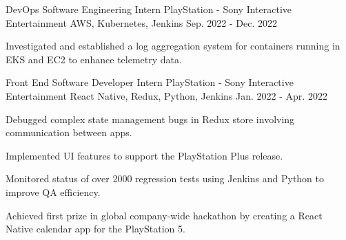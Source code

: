 

\begin{cventries}

  \cventry
    {DevOps Software Engineering Intern} %
    {PlayStation - Sony Interactive Entertainment} %
    {AWS, Kubernetes, Jenkins} %
    {Sep. 2022 - Dec. 2022} %
    {
      \begin{cvitems} %
        \item {Investigated and established a log aggregation system for containers running in EKS and EC2 to enhance telemetry data.}
        \item {}
      \end{cvitems}
    }

  \cventry
    {Front End Software Developer Intern} %
    {PlayStation - Sony Interactive Entertainment} %
    {React Native, Redux, Python, Jenkins} %
    {Jan. 2022 - Apr. 2022} %
    {
      \begin{cvitems} %
        \item {Debugged complex state management bugs in Redux store involving communication between apps.}
        \item {Implemented UI features to support the PlayStation Plus release.}
        \item {Monitored status of over 2000 regression tests using Jenkins and Python to improve QA efficiency.} 
        \item {Achieved first prize in global company-wide hackathon by creating a React Native calendar app for the PlayStation 5.}
      \end{cvitems}
    }



\end{cventries}
